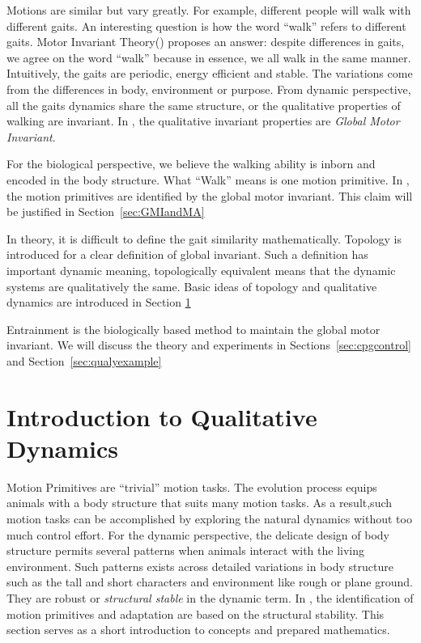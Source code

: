 Motions are similar but vary greatly.
For example, different people will walk with different gaits. 
An interesting question  is how the word ``walk'' refers to different gaits.
Motor Invariant Theory(\moit) proposes an answer:  despite differences in gaits, we agree on the word ``walk''  because in essence, we all walk in the same manner.
Intuitively, the gaits are periodic, energy efficient and stable.
The variations come from the differences in body, environment or purpose.
From dynamic perspective, all the gaits dynamics share the same structure, or the qualitative properties of walking are invariant.
In \moit, the qualitative invariant properties are \emph{Global Motor Invariant}.


For the biological perspective, we believe the walking ability is inborn and encoded in the body structure.
What ``Walk'' means is one motion primitive.
In \moit, the motion primitives are identified by the global motor invariant.
This claim will be justified in Section~\ref{sec:GMIandMA}


In theory, it is difficult to define the gait similarity mathematically.
Topology is introduced for a clear definition of global invariant.
Such a definition has important dynamic meaning, topologically equivalent means that the dynamic systems are qualitatively the same.
Basic ideas of topology and qualitative dynamics are introduced in Section \ref{sec:qualiDy}

Entrainment is the biologically based method to maintain the global motor invariant.
We will discuss the theory and experiments in Sections~\ref{sec:cpgcontrol} and Section~\ref{sec:qualyexample}







\section{Introduction to Qualitative Dynamics}
\label{sec:qualiDy}
Motion Primitives are ``trivial'' motion tasks.
The evolution process equips animals with a body structure that suits many motion tasks.
As a result,such motion tasks can be accomplished by exploring the natural dynamics without too much control effort.
For the dynamic perspective, the delicate design of body structure permits several patterns when animals interact with the living environment.  
Such patterns exists across detailed variations in body structure such as the tall and short characters and environment like rough or plane ground.
They are robust or \emph{structural stable} in the dynamic term.
In \moit, the identification of motion primitives and adaptation are based on the structural stability.
This section serves as a short introduction to concepts and prepared mathematics.


